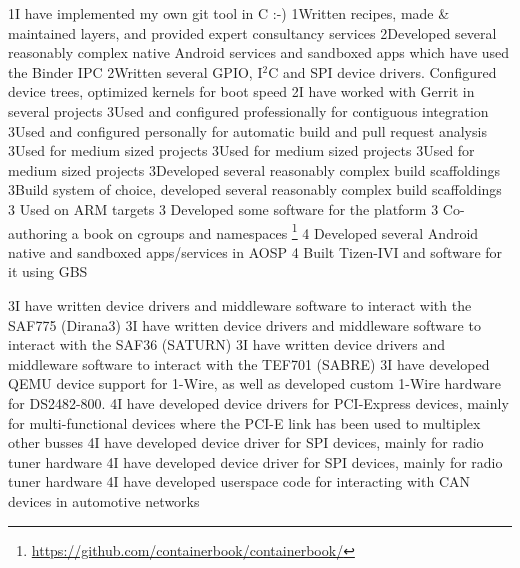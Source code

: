 \documentclass{twocolcv}
\begin{document}
 {
                {1}{I have implemented my own git tool in C :-)}
              {1}{Written recipes, made \& maintained layers, and provided expert consultancy services}
     {2}{Developed several reasonably complex native Android services and sandboxed apps which have used the Binder IPC}
       {2}{Written several GPIO, I$^2$C and SPI device drivers. Configured device trees, optimized kernels for boot speed}
             {2}{I have worked with Gerrit in several projects}
            {3}{Used and configured professionally for contiguous integration }
          {3}{Used and configured personally for automatic build and pull request analysis }
            {3}{Used for medium sized projects}
               {3}{Used for medium sized projects}
             {3}{Used for medium sized projects}
           {3}{Developed several reasonably complex build scaffoldings}
              {3}{Build system of choice, developed several reasonably complex build scaffoldings}
             {3} {Used on ARM targets}
          {3} {Developed some software for the platform}
        {3} {Co-authoring a book on cgroups and namespaces \footnote{\url{https://github.com/containerbook/containerbook/}}}
       {4} {Developed several Android native and sandboxed apps/services in AOSP}
     {4} {Built Tizen-IVI and software for it using GBS}
}

 {
      {3}{I have written device drivers and middleware software to interact with the SAF775 (Dirana3)}
       {3}{I have written device drivers and middleware software to interact with the SAF36 (SATURN)}
      {3}{I have written device drivers and middleware software to interact with the TEF701 (SABRE)}
     {3}{I have developed QEMU device support for 1-Wire, as well as developed custom 1-Wire hardware for DS2482-800.}
     {4}{I have developed device drivers for PCI-Express devices, mainly for multi-functional devices where the PCI-E link has been used to multiplex other busses}
             {4}{I have developed device driver for SPI devices, mainly for radio tuner hardware}
          {4}{I have developed device driver for SPI devices, mainly for radio tuner hardware}
             {4}{I have developed userspace code for interacting with CAN devices in automotive networks}
}
\end{document}
